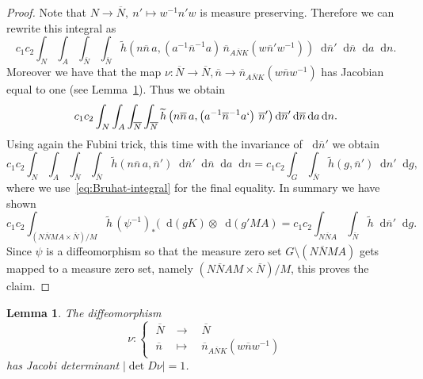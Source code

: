 \documentclass[10pt]{amsart}
\newtheorem{lemm}[cdrthm]{Lemma}
\theoremstyle{definition}
\newcommand{\til}{\widetilde}
\newcommand{\intd}{\mathop{}\!\mathrm{d}}
\newcommand{\bn}{{\overline{n}}}
\newcommand{\bN}{{\overline{N}}}
\begin{document}
\begin{proof}
Note that $N\to \bN,\ n'\mapsto w^{-1}n'w$ is measure preserving. Therefore we can rewrite this integral as
\[
c_1c_2\int_{N}\int_A \int_\bN\int_\bN\til h\left(n\overline n\,a, \left(a^{-1}\overline n^{-1}a\right)\,
\overline n_{A\bN K}\left(w\overline n' w^{-1}\right)\right)\intd \overline n'\intd \overline n\intd a\intd n.
\]
Moreover we have that the map $\nu:\bN\to\bN, \bn\to \bn_{A\bN K}(w\bn w^{-1})$ has Jacobian equal to one (see Lemma~\ref{lem:Jac_nu}). Thus we obtain
\[
c_1c_2\int_{N}\int_A \int_\bN\int_\bN\til h\left(n\overline n\,a, \left(a^{-1}\overline n^{-1}a`\right)\, \overline n'\right)\intd \overline n'\intd \overline n\intd a\intd n.
\]
Using again the Fubini trick, this time with the invariance of $\intd \bn'$ we obtain
\[
c_1c_2\int_{N}\int_A \int_\bN\int_\bN\til h(n\overline n\,a,\overline n')\intd \overline n'\intd \overline n\intd a\intd n =c_1c_2\int_{G}\int_\bN\til h(g,\overline n')\intd n'\intd g,
\]
where we use~\eqref{eq:Bruhat-integral} for the final equality. In summary we have shown
\[
c_1c_2\int_{(N\bN MA\times \bN)/M} \til h\,(\psi^{-1})_*(\intd(gK)\otimes\intd(g'MA) =c_1c_2\int_{N\bN A}\int_\bN\til h\intd \overline n'\intd g.
\]
Since $\psi$ is a diffeomorphism so that the measure zero set $G\setminus(N\bN MA)$ gets mapped to a measure zero set, namely $(N\bN AM\times \bN)/M$, this proves the claim.
\end{proof}


\begin{lemm}\label{lem:Jac_nu}
The diffeomorphism
\[
\nu:
\begin{cases}
\;\bN &\rightarrow\quad\bN\\
\;\bn &\mapsto\quad\bn_{A\bN K}\left(w\bn w^{-1}\right)
\end{cases}
\]
has Jacobi determinant $|\det D\nu|=1$.
\end{lemm}
\end{document}
